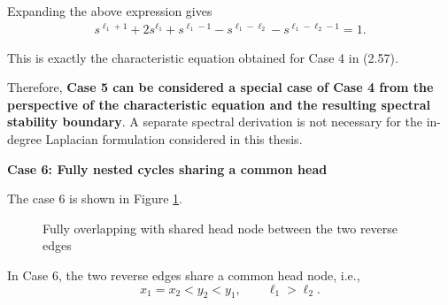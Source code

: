 \documentclass[11pt,a4paper]{article}
\begin{document}
Expanding the above expression gives
\begin{equation}
\begin{aligned}
    s^{\ell_1+1}
    +2s^{\ell_1}
    +s^{\ell_1-1}
    -s^{\ell_1-\ell_2}
    -s^{\ell_1-\ell_2-1}
    =1.
\end{aligned}
\tag{2.60a}
\end{equation}

This is exactly the characteristic equation obtained for Case 4 in (2.57).

Therefore, \textbf{Case 5 can be considered a special case of Case 4 from the perspective of the characteristic equation and the resulting spectral stability boundary}. A separate spectral derivation is not necessary for the in-degree Laplacian formulation considered in this thesis.

\medskip
\noindent
\textbf{Case 6: Fully nested cycles sharing a common head}

The case 6 is shown in Figure \ref{Case6}.

\begin{figure}[H]
		\centering
		\caption{Fully overlapping with shared head node between the two reverse edges}
		\label{Case6}
	\end{figure}

In Case 6, the two reverse edges share a common head node, i.e.,
\begin{equation}
    x_1 = x_2 < y_2 < y_1,
    \qquad \ell_1 > \ell_2.
\end{equation}
\end{document}
